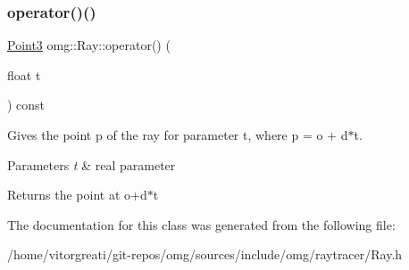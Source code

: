 \subsubsection{\texorpdfstring{operator()()}{operator()()}}
{\footnotesize\ttfamily \mbox{\hyperlink{namespaceomg_af85242d35fdacf829d32a6f9b95f3e35}{Point3}} omg\+::\+Ray\+::operator() (\begin{DoxyParamCaption}\item[{float}]{t }\end{DoxyParamCaption}) const\hspace{0.3cm}{\ttfamily [inline]}}



Gives the point p of the ray for parameter t, where p = o + d$\ast$t. 


\begin{DoxyParams}{Parameters}
{\em t} & real parameter \\
\hline
\end{DoxyParams}
\begin{DoxyReturn}{Returns}
the point at o+d$\ast$t 
\end{DoxyReturn}


The documentation for this class was generated from the following file\+:\begin{DoxyCompactItemize}
\item 
/home/vitorgreati/git-\/repos/omg/sources/include/omg/raytracer/Ray.\+h\end{DoxyCompactItemize}
